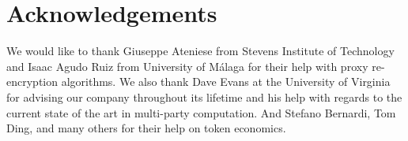 \documentclass[longbibliography,nofootinbib]{revtex4-1}
\begin{document}
\section{Acknowledgements}
We would like to thank Giuseppe Ateniese from Stevens Institute of Technology and Isaac Agudo Ruiz from University of M{\'a}laga
for their help with proxy re-encryption algorithms.
We also thank Dave Evans at the University of Virginia for advising our company throughout its lifetime
and his help with regards to the current state of the art in multi-party computation.
And Stefano Bernardi, Tom Ding, and many others for their help on token economics.


\end{document}
